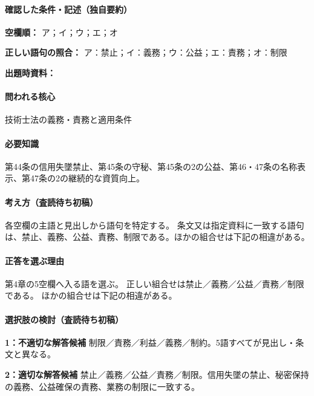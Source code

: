 \paragraph{確認した条件・記述（独自要約）}\mbox{}\par

\noindent\textbf{空欄順：} ア；イ；ウ；エ；オ\par

\noindent\textbf{正しい語句の照合：} ア：禁止；イ：義務；ウ：公益；エ：責務；オ：制限\par

\noindent\textbf{出題時資料：} \par

\paragraph{問われる核心} 技術士法の義務・責務と適用条件

\paragraph{必要知識} 第44条の信用失墜禁止、第45条の守秘、第45条の2の公益、第46・47条の名称表示、第47条の2の継続的な資質向上。

\paragraph{考え方（査読待ち初稿）} 各空欄の主語と見出しから語句を特定する。 条文又は指定資料に一致する語句は、禁止、義務、公益、責務、制限である。ほかの組合せは下記の相違がある。

\paragraph{正答を選ぶ理由} 第4章の5空欄へ入る語を選ぶ。 正しい組合せは禁止／義務／公益／責務／制限である。 ほかの組合せは下記の相違がある。

\paragraph{選択肢の検討（査読待ち初稿）}\mbox{}\par

\noindent\textbf{1：不適切な解答候補} 制限／責務／利益／義務／制約。5語すべてが見出し・条文と異なる。\par

\noindent\textbf{2：適切な解答候補} 禁止／義務／公益／責務／制限。信用失墜の禁止、秘密保持の義務、公益確保の責務、業務の制限に一致する。\par


